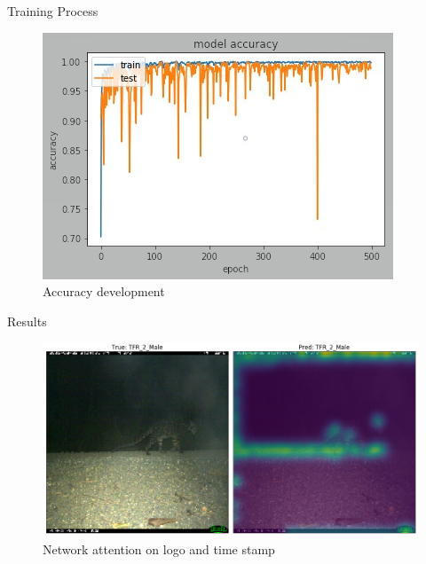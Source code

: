 \documentclass[10pt]{beamer}
\begin{document}

\begin{frame}{Training Process}
	\begin{figure}
		\includegraphics[width=.9\columnwidth,height=\textheight,keepaspectratio]{images/Pretrain_acc_ResNet50_cropped_heavy_augment_lr0_0001.jpg}
		\caption{Accuracy development}
	\end{figure}
\end{frame}



\begin{frame}{Results}
	\begin{figure}
		\includegraphics[width=\columnwidth]{images/Attention_Leo_Stamp2.png}
		\caption{Network attention on logo and time stamp}
	\end{figure}
\end{frame}
\end{document}
